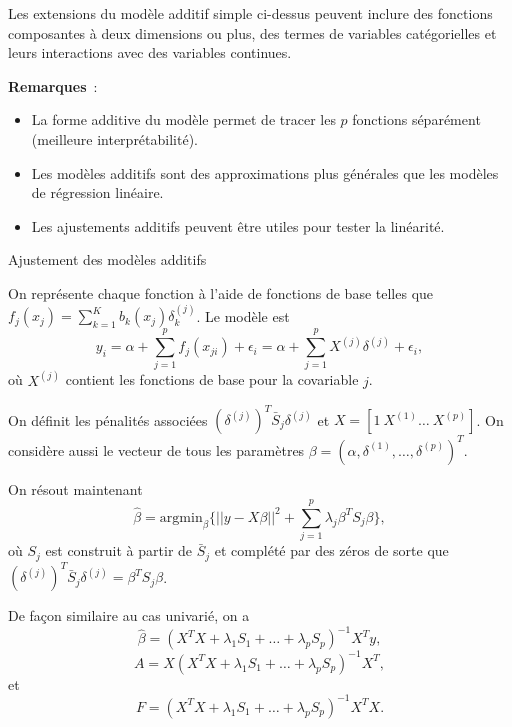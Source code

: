 \documentclass{BeamerTemplate}
\begin{document}
\begin{refsection}
\begin{frame}{}
\bigskip
Les extensions du modèle additif simple ci-dessus peuvent inclure des fonctions composantes
à deux dimensions ou plus, des termes de variables catégorielles et leurs interactions
avec des variables continues.
\end{frame}

\begin{frame}{}
\textbf{Remarques}~:
\begin{itemize} 
\item La forme additive du modèle permet de tracer les $p$ fonctions
séparément (meilleure interprétabilité).
\item Les modèles additifs sont des approximations plus générales que les modèles de régression linéaire.
\item Les ajustements additifs peuvent être utiles pour tester la linéarité.
\end{itemize}

\end{frame}


\begin{frame}{Ajustement des modèles additifs}

On représente chaque fonction à l'aide de fonctions de base telles que $f_j(x_j) =
\sum_{k=1}^K b_k(x_j) \delta_k^{(j)}$. Le modèle est
$$y_i = \alpha+ \sum_{j=1}^p f_j(x_{ji}) +\epsilon_i = \alpha+ \sum_{j=1}^p X^{(j)} \delta^{(j)} +\epsilon_i,$$
où $X^{(j)}$ contient les fonctions de base pour la covariable $j$. 

\bigskip 
On définit les pénalités associées $(\delta^{(j)})^T \bar{S}_j \delta^{(j)}$ et $X
= [1 \  X^{(1)}  \ldots  \ X^{(p)} ]$. On considère aussi le vecteur de tous les
paramètres $\beta = (\alpha, \delta^{(1)}, \ldots, \delta^{(p)})^T$.
\end{frame}



\begin{frame}{}
On résout maintenant
 $$\hat{\beta} = \mbox{argmin}_{\beta} \{  ||y - X \beta ||^2 + \sum_{j=1}^{p} \lambda_j  \beta^T S_j \beta \},$$
où $S_j$ est construit à partir de $\bar{S}_j$ et complété par des zéros de sorte que
$(\delta^{(j)})^T \bar{S}_j \delta^{(j)} = \beta^T S_j \beta$.

\bigskip
De façon similaire au cas univarié, on a
$$\hat{\beta} = (X^T X + \lambda_1 S_1 + \ldots + \lambda_p S_p)^{-1} X^T y,$$
$$A = X (X^T X + \lambda_1 S_1 + \ldots + \lambda_p S_p)^{-1} X^T,$$
et
$$F = (X^T X + \lambda_1 S_1 + \ldots + \lambda_p S_p)^{-1} X^T X .$$
\end{frame}



\end{refsection}
\end{document}
